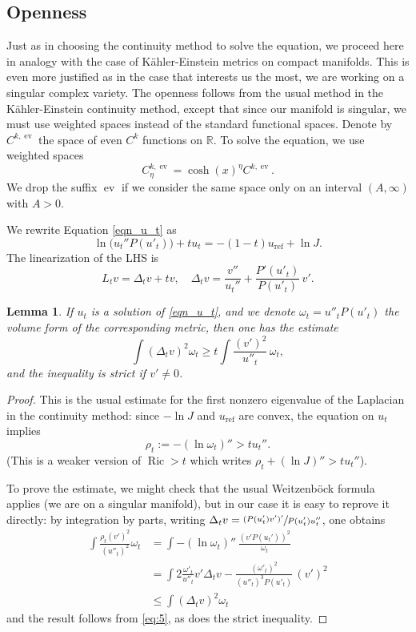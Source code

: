 \documentclass[10pt]{amsart}
\theoremstyle{plain}
\newtheorem{lem}[thm]{Lemma}
\theoremstyle{definition}
\DeclareMathOperator{\ev}{ev}
\DeclareMathOperator{\Ric}{Ric}
\begin{document}
\subsection{Openness}
Just as in choosing the continuity method to solve the equation, we proceed here in analogy
with the case of Kähler-Einstein metrics on compact manifolds. This is even more justified
as in the case that interests us the most, we are working on a singular complex variety.
The openness follows from the usual method in the Kähler-Einstein continuity method, except that since our manifold is singular, we must use weighted spaces instead of the standard functional spaces.
Denote by $C^{k,\ev}$ the space of even $C^k$ functions on $\mathbb{R}$. To solve the equation, we use weighted spaces
\begin{equation}
C^{k,\ev}_\eta=\cosh(x)^\eta C^{k,\ev} .
\end{equation}
We drop the suffix $\ev$ if we consider the same space only on an interval $(A,\infty)$ with $A>0$.

We rewrite Equation \eqref{eqn_u_t} as
\begin{equation}
\label{eq:3}
\ln \big( u_t''P(u'_t) \big) + t u_t = -(1-t)u_{\mathrm{ref}} + \ln J.
\end{equation}
The linearization of the LHS is
\begin{equation}
L_tv = \Delta_tv + t v, \quad \Delta_tv = \frac{v''}{u_t''} + \frac{P'(u'_t)}{P(u'_t)}\, v' .
\end{equation}

\begin{lem}\label{lem:vp-D}
If $u_t$ is a solution of \eqref{eqn_u_t}, and we denote $\omega_t=u''_t P(u'_t)$ the volume form of the corresponding metric, then one has the estimate
\[ \int (\Delta_tv)^2 \omega_t \geq t \int \frac{(v')^2}{u''_t}\, \omega_t, \]
and the inequality is strict if $v'\neq0$.
\end{lem}
\begin{proof}
This is the usual estimate for the first nonzero eigenvalue of the Laplacian in the continuity method: since $-\ln J$ and $u_{\mathrm{ref}}$ are convex, the equation on $u_t$ implies
\begin{equation}
\rho_t := -(\ln \omega_t)'' > t u_t''.\label{eq:5}
\end{equation}
(This is a weaker version of $\Ric> t$ which writes $\rho_t+(\ln J)''>t u_t''$).

To prove the estimate, we might check that the usual Weitzenböck formula applies (we are on a singular manifold), but in our case it is easy to reprove it directly: by integration by parts, writing $\Delta_tv=\sfrac{(P(u_t')v')'}{P(u_t')u_t''}$, one obtains
\begin{align*}
\int \frac{\rho_t(v')^2}{(u''_t)^2} \omega_t
& = \int -(\ln \omega_t)''\, \frac{(v' P(u_t'))^2}{\omega_t} \\
& = \int 2 \frac{\omega'_t}{u''_t} v' \Delta_tv - \frac{(\omega'_t)^2}{(u''_t)^3P(u'_t)}\, (v')^2 \\
& \leq \int (\Delta_tv)^2 \omega_t
\end{align*}
and the result follows from \eqref{eq:5}, as does the strict inequality.
\end{proof}
\end{document}
